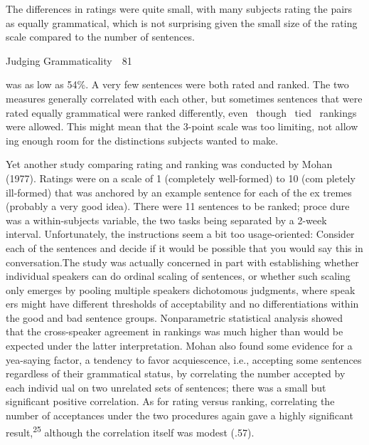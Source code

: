 \begin{listWWNumxlviileveli}
\item 
\begin{styleStandard}
The differences in ratings were quite small, with many subjects rating the pairs as equally grammatical, which is not surprising given the small size of the rating scale compared to the number of sentences.
\end{styleStandard}


\end{listWWNumxlviileveli}
\clearpage\setcounter{page}{1}\begin{styleStandard}
Judging Grammaticality\ \ 81
\end{styleStandard}


\begin{styleStandard}
was as low as 54\%. A very few sentences were both rated and ranked. The two measures generally correlated with each other, but sometimes sentences that were rated equally grammatical were ranked differently, even \ though \ tied \ rankings were allowed. This might mean that the 3-point scale was too limiting, not allow\- ing enough room for the distinctions subjects wanted to make.
\end{styleStandard}


\begin{styleStandard}
Yet another study comparing rating and ranking was conducted by Mohan (1977). Ratings were on a scale of 1 ({\textquotedbl}completely well-formed{\textquotedbl}) to 10 ({\textquotedbl}com\- pletely ill-formed{\textquotedbl}) that was anchored by an example sentence for each of the ex\- tremes (probably a very good idea). There were 11 sentences to be ranked; proce\- dure was a within-subjects variable, the two tasks being separated by a 2-week interval. Unfortunately, the instructions seem a bit too usage-oriented: {\textquotedbl}Consider each of the sentences and decide if it would be possible that you would say this in conversation.{\textquotedbl}The study was actually concerned in part with establishing whether individual speakers can do ordinal scaling of sentences, or whether such scaling only emerges by pooling multiple speakers{\textquotesingle} dichotomous judgments, where speak\- ers might have different thresholds of acceptability and no differentiations within the good and bad sentence groups. Nonparametric statistical analysis showed that the cross-speaker agreement in rankings was much higher than would be expected under the latter interpretation. Mohan also found some evidence for a yea-saying factor, a tendency to favor acquiescence, i.e., accepting some sentences regardless of their grammatical status, by correlating the number accepted by each individ\- ual on two unrelated sets of sentences; there was a small but significant positive correlation. As for rating versus ranking, correlating the number of acceptances under the two procedures again gave a highly significant result,\textsuperscript{25}\textsuperscript{ }although the correlation itself was modest (.57).
\end{styleStandard}


